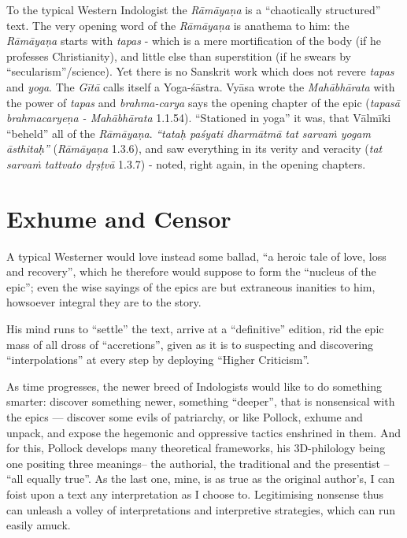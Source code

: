 To the typical Western Indologist the {\sl Rāmāyaṇa} is a ``chaotically structured'' text. The very opening word of the {\sl Rāmāyaṇa} is anathema to him: the {\sl Rāmāyaṇa} starts with {\sl tapas} -  which is a mere mortification of the body (if he professes Christianity), and little else than superstition (if he swears by ``secularism''/science). Yet there is no Sanskrit work which does not revere {\sl tapas} and {\sl yoga}. The {\sl Gītā} calls itself a Yoga-śāstra. Vyāsa wrote the {\sl Mahābhārata} with the power of {\sl tapas} and {\sl brahma-carya} says the opening chapter of the epic ({\sl tapasā brahmacaryeṇa  - Mahābhārata} 1.1.54). ``Stationed in yoga'' it was, that Vālmīki  ``beheld'' all of the {\sl Rāmāyaṇa}. {\sl ``tataḥ paśyati dharmātmā tat sarvaṁ yogam āsthitaḥ''} ({\sl Rāmāyaṇa} 1.3.6), and saw everything in its verity and veracity ({\sl tat sarvaṁ tattvato dṛṣṭvā} 1.3.7) - noted, right again, in the opening chapters.

\section*{Exhume and Censor}

A typical Westerner would love instead some ballad, ``a heroic tale of love, loss and recovery'', which he therefore would suppose to form the ``nucleus of the epic''; even the wise sayings of the epics are but extraneous inanities to him, howsoever integral they are to the story.

His mind runs to “settle” the text, arrive at a “definitive” edition, rid the epic mass of all dross of  “accretions”, given as it is to suspecting and discovering “interpolations” at every step by deploying “Higher Criticism”.

As time progresses, the newer breed of Indologists would like to do something smarter: discover something newer, something “deeper”, that is nonsensical with the epics --- discover some evils of patriarchy, or like Pollock, exhume and unpack, and expose the hegemonic and oppressive tactics enshrined in them. And for this, Pollock develops many theoretical frameworks, his 3D-philology being one positing three meanings-- the authorial, the traditional and the presentist -- “all equally true”. As the last one, mine, is as true as the original author's, I can foist upon a text any interpretation as I choose to. Legitimising nonsense thus can unleash a volley of interpretations and interpretive strategies, which can run easily amuck.

